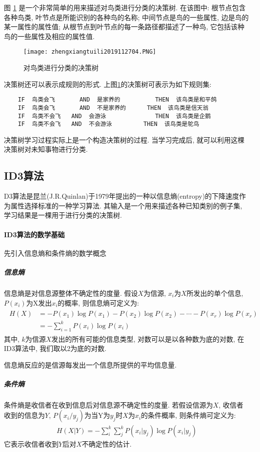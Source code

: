图 \ref{AI32fig2704} 是一个非常简单的用来描述对鸟类进行分类的决策树.
在该图中: 根节点包含各种鸟类, 叶节点是所能识别的各种鸟的名称;  中间节点是鸟的一些属性, 边是鸟的某一属性的属性值;
从根节点到叶节点的每一条路径都描述了一种鸟, 它包括该种鸟的一些属性及相应的属性值.
\begin{figure}[H]
\centering
\texttt{[image: zhengxiangtuili2019112704.PNG]}
\caption{对鸟类进行分类的决策树}
\label{AI32fig2704}
\end{figure}
 决策树还可以表示成规则的形式. 上图\ref{AI32fig2704}的决策树可表示为如下规则集:
\begin{Verbatim}
    IF  鸟类会飞       AND  是家养的          THEN  该鸟类是和平鸽
    IF  鸟类会飞       AND  不是家养的      THEN  该鸟类是信天翁
    IF  鸟类不会飞   AND  会游泳              THEN  该鸟类是企鹅
    IF  鸟类不会飞   AND  不会游泳         THEN  该鸟类是鸵鸟
\end{Verbatim}

决策树学习过程实际上是一个构造决策树的过程. 当学习完成后, 就可以利用这棵决策树对未知事物进行分类.
\subsection{ID3算法}
D3算法是昆兰(J.R.Quinlan)于1979年提出的一种以信息熵(entropy)的下降速度作为属性选择标准的一种学习算法. 其输入是一个用来描述各种已知类别的例子集, 学习结果是一棵用于进行分类的决策树.

\paragraph{ID3算法的数学基础}
先引入信息熵和条件熵的数学概念
\subparagraph{信息熵}
信息熵是对信息源整体不确定性的度量. 假设$X$为信源, $x_i$为$X$所发出的单个信息, $P(x_i)$为X发出$x_i$的概率, 则信息熵可定义为:
\begin{align}
  \begin{aligned}
  H(X) &=-P\left(x_{1}\right) \log P\left(x_{1}\right)-P\left(x_{2}\right) \log P\left(x_{2}\right)-\cdots-P\left(x_{r}\right) \log P\left(x_{r}\right) \\
                       &=-\sum_{i=1}^{k} P\left(x_{i}\right) \log P\left(x_{i}\right)
  \end{aligned}
\end{align}
其中, $k$为信源$X$发出的所有可能的信息类型, 对数可以是以各种数为底的对数, 在ID3算法中, 我们取以2为底的对数.
\begin{remark}
 信息熵反应的是信源每发出一个信息所提供的平均信息量.
\end{remark}
\subparagraph{条件熵}
条件熵是收信者在收到信息后对信息源不确定性的度量. 若假设信源为$X$, 收信者收到的信息为$Y$,  $P(x_i/y_j)$为当Y为$y_j$时$X$为$x_i$的条件概率, 则条件熵可定义为:
\begin{align}
  H(X | Y)=-\sum_{i}^{k} \sum_{j}^{k} P\left(x_{i} | y_{j}\right) \log P\left(x_{i} | y_{j}\right)
\end{align}
它表示收信者收到$Y$后对$X$不确定性的估计.

